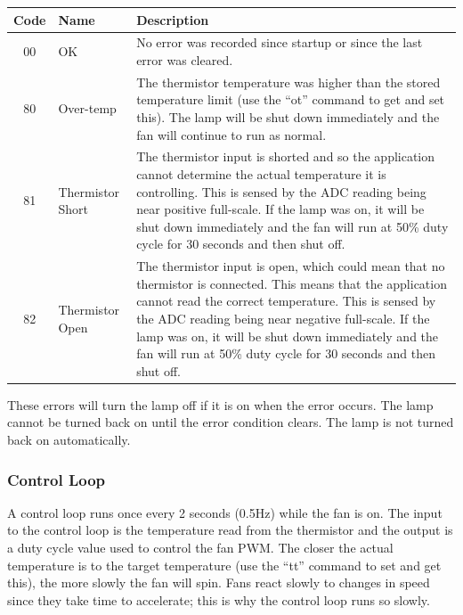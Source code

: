 \documentclass{article}
\begin{document}
\begin{center}
    \begin{tabular}{c|l|p{}}
        Code & Name & Description \\
        \hline
        00 & OK & No error was recorded since startup or since the last error was cleared. \\
        80 & Over-temp & The thermistor temperature was higher than the stored temperature limit (use
        the ``ot'' command to get and set this). The lamp will be shut down immediately and the fan
        will continue to run as normal.\\
        81 & Thermistor Short & The thermistor input is shorted and so the application cannot determine
        the actual temperature it is controlling.  This is sensed by the ADC reading being near
        positive full-scale.  If the lamp was on, it will be shut down immediately and the fan will
        run at 50\% duty cycle for 30 seconds and then shut off. \\
        82 & Thermistor Open & The thermistor input is open, which could mean that no thermistor is
        connected.  This means that the application cannot read the correct temperature.  This is
        sensed by the ADC reading being near negative full-scale. If the lamp was on, it will be
        shut down immediately and the fan will run at 50\% duty cycle for 30 seconds and then shut 
        off. \\
    \end{tabular}
\end{center}

These errors will turn the lamp off if it is on when the error occurs.  The lamp cannot be turned
back on until the error condition clears.  The lamp is not turned back on automatically.

\subsubsection{Control Loop} \label{sssec:FWAppCLoop}
A control loop runs once every 2 seconds (0.5Hz) while the fan is on.  The input to the control loop
is the temperature read from the thermistor and the output is a duty cycle value used to control the
fan PWM.  The closer the actual temperature is to the target temperature (use the ``tt'' command to
set and get this), the more slowly the fan will spin.  Fans react slowly to changes in speed since
they take time to accelerate; this is why the control loop runs so slowly.
\end{document}
